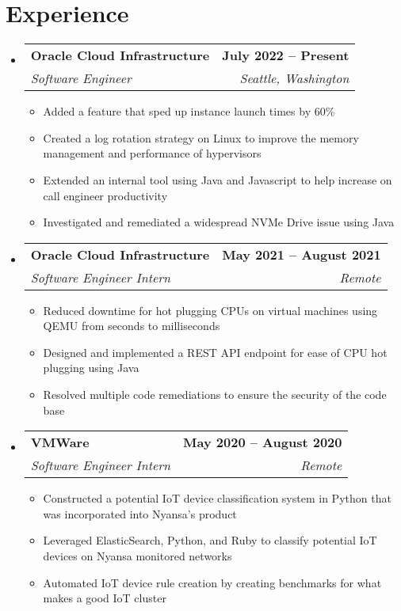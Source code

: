 \documentclass[letterpaper,11pt]{article}
\makeatletter
\newcommand{\resumeItem}[1]{
  \item\small{
    {#1 \vspace{-2pt}}
  }
}
\newcommand{\resumeSubheading}[4]{
  \vspace{-2pt}\item
    \begin{tabular*}{1.0\textwidth}[t]{l@{\extracolsep{\fill}}r}
      \textbf{#1} & \textbf{\small #2} \\
      \textit{\small#3} & \textit{\small #4} \\
    \end{tabular*}\vspace{-7pt}
}
\newcommand{\resumeSubHeadingListStart}{\begin{itemize}[leftmargin=0.0in, label={}]}
\newcommand{\resumeSubHeadingListEnd}{\end{itemize}}
\newcommand{\resumeItemListStart}{\begin{itemize}}
\newcommand{\resumeItemListEnd}{\end{itemize}\vspace{-5pt}}
\makeatother
\begin{document}
\section{Experience}
  \resumeSubHeadingListStart

    \resumeSubheading
      {Oracle Cloud Infrastructure}{July 2022 -- Present}
      {Software Engineer}{Seattle, Washington}
      \resumeItemListStart
        \resumeItem{Added a feature that sped up instance launch times by 60\%}
        \resumeItem{Created a log rotation strategy on Linux to improve the memory management and performance of hypervisors}
        \resumeItem{Extended an internal tool using Java and Javascript to help increase on call engineer productivity}
        \resumeItem{Investigated and remediated a widespread NVMe Drive issue using Java}
      \resumeItemListEnd

    \resumeSubheading
      {Oracle Cloud Infrastructure}{May 2021 -- August 2021}
      {Software Engineer Intern}{Remote}
      \resumeItemListStart
        \resumeItem{Reduced downtime for hot plugging CPUs on virtual machines using QEMU from seconds to milliseconds}
        \resumeItem{Designed and implemented  a REST API endpoint for ease of CPU hot plugging using Java}
        \resumeItem{Resolved multiple code remediations to ensure the security of the code base}
    \resumeItemListEnd

    \resumeSubheading
      {VMWare}{May 2020 -- August 2020}
      {Software Engineer Intern}{Remote}
      \resumeItemListStart
        \resumeItem{Constructed a potential IoT device classification system in Python that was incorporated into Nyansa’s product}
        \resumeItem{Leveraged ElasticSearch, Python, and Ruby to classify potential IoT devices on Nyansa monitored networks}
        \resumeItem{Automated IoT device rule creation by creating benchmarks for what makes a good IoT cluster}
    \resumeItemListEnd
    
  \resumeSubHeadingListEnd
\vspace{-16pt}

\end{document}
